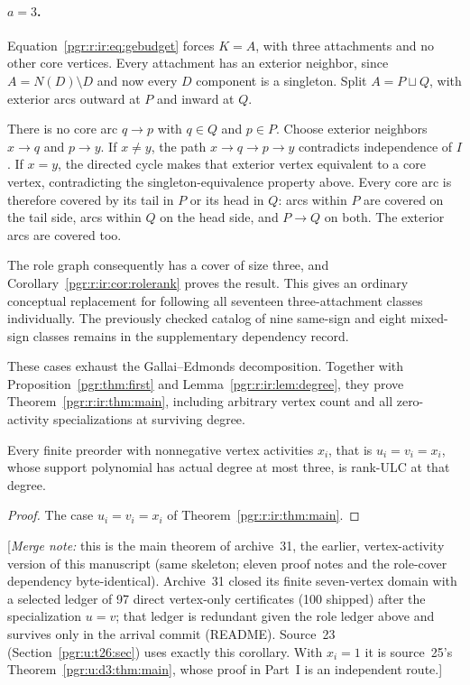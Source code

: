 \documentclass[11pt]{article}
\numberwithin{equation}{section}
\theoremstyle{definition}\newtheorem{definition}[theorem]{Definition}\newtheorem{remark}[theorem]{Remark}
\newcommand{\mnote}[1]{[\textit{Merge note:} #1]}
\begin{document}
\paragraph{$a=3$.}
Equation~\eqref{pgr:r:ir:eq:gebudget} forces $K=A$, with three attachments and no other core vertices. Every attachment has an exterior neighbor, since $A=N(D)\setminus D$ and now every $D$ component is a singleton. Split $A=P\sqcup Q$, with exterior arcs outward at $P$ and inward at $Q$.

There is no core arc $q\to p$ with $q\in Q$ and $p\in P$. Choose exterior neighbors $x\to q$ and $p\to y$. If $x\ne y$, the path $x\to q\to p\to y$ contradicts independence of $I$. If $x=y$, the directed cycle makes that exterior vertex equivalent to a core vertex, contradicting the singleton-equivalence property above. Every core arc is therefore covered by its tail in $P$ or its head in $Q$: arcs within $P$ are covered on the tail side, arcs within $Q$ on the head side, and $P\to Q$ on both. The exterior arcs are covered too.

The role graph consequently has a cover of size three, and Corollary~\ref{pgr:r:ir:cor:rolerank} proves the result. This gives an ordinary conceptual replacement for following all seventeen three-attachment classes individually. The previously checked catalog of nine same-sign and eight mixed-sign classes remains in the supplementary dependency record.

These cases exhaust the Gallai--Edmonds decomposition. Together with Proposition~\ref{pgr:thm:first} and Lemma~\ref{pgr:r:ir:lem:degree}, they prove Theorem~\ref{pgr:r:ir:thm:main}, including arbitrary vertex count and all zero-activity specializations at surviving degree.

\begin{corollary}\label{pgr:r:ir:cor:vertex}
Every finite preorder with nonnegative vertex activities $x_i$, that is
$u_i=v_i=x_i$, whose support polynomial has actual degree at most three,
is rank-ULC at that degree.
\end{corollary}
\begin{proof}
The case $u_i=v_i=x_i$ of Theorem~\ref{pgr:r:ir:thm:main}.
\end{proof}
\mnote{this is the main theorem of archive~31, the earlier, vertex-activity
version of this manuscript (same skeleton; eleven proof notes and the
role-cover dependency byte-identical). Archive~31 closed its finite
seven-vertex domain with a selected ledger of 97 direct vertex-only
certificates (100 shipped) after the specialization $u=v$; that ledger is
redundant given the role ledger above and survives only in the arrival
commit (README). Source~23 (Section~\ref{pgr:u:t26:sec}) uses exactly this
corollary. With $x_i=1$ it is source~25's Theorem~\ref{pgr:u:d3:thm:main},
whose proof in Part~I is an independent route.}
\end{document}
